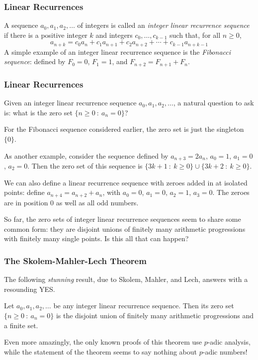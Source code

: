 \documentclass[10pt]{beamer}
\begin{document}
\begin{frame}
    \frametitle{Linear Recurrences}
    
    A sequence $a_0,a_1,a_2,\dots$ of integers is called an \emph{integer linear recurrence sequence} if there is a positive integer $k$ and integers $c_0,\dots,c_{k-1}$ such that, for all $n\geq 0$,
    \[a_{n+k}=c_0a_n+c_1a_{n+1}+c_2a_{n+2}+\cdots + c_{k-1}a_{n+k-1}\]
    A simple example of an integer linear recurrence sequence is the \emph{Fibonacci sequence}: defined by $F_0=0$, $F_1=1$, and $F_{n+2}=F_{n+1}+F_{n}$.
\end{frame}

\begin{frame}
    \frametitle{Linear Recurrences}
    Given an integer linear recurrence sequence $a_0,a_1,a_2,\dots$, a natural question to ask is: what is the zero set $\{n\geq 0\ :\ a_n=0\}$?
    
    For the Fibonacci sequence considered earlier, the zero set is just the singleton $\{0\}$. 
    
    As another example, consider the sequence defined by $a_{n+3}=2a_n$, $a_0=1$, $a_1=0$, $a_2=0$. Then the zero set of this sequence is $\{3k+1\ :\ k\geq 0\}\cup \{3k+2\ :\ k\geq 0\}$.
    
    We can also define a linear recurrence sequence with zeroes added in at isolated points: define $a_{n+4}=a_{n+2}+a_n$, with $a_0=0$, $a_1=0$, $a_2=1$, $a_3=0$. The zeroes are in position $0$ as well as all odd numbers.
    
    So far, the zero sets of integer linear recurrence sequences seem to share some common form: they are disjoint unions of finitely many arithmetic progressions with finitely many single points. Is this all that can happen? 
\end{frame}

\begin{frame}
    \frametitle{The Skolem-Mahler-Lech Theorem}
    
    The following \emph{stunning} result, due to Skolem, Mahler, and Lech, answers with a resounding YES.
    \begin{theorem}
        Let $a_0,a_1,a_2,\dots$ be any integer linear recurrence sequence. Then its zero set $\{n\geq 0\ :\ a_n=0\}$ is the disjoint union of finitely many arithmetic progressions and a finite set.
    \end{theorem}
    Even more amazingly, the only known proofs of this theorem use $p$-adic analysis, while the statement of the theorem seems to say nothing about $p$-adic numbers!
\end{frame}
\end{document}
